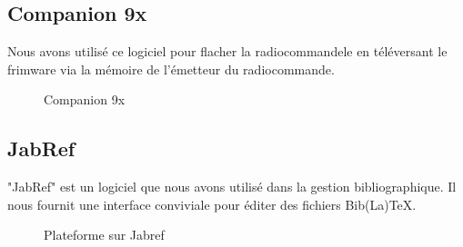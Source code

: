	\subsection{Companion 9x}
	Nous avons utilisé ce logiciel pour flacher la radiocommandele en téléversant le frimware via la mémoire de l'émetteur du radiocommande.
	\begin{figure}[H]
		\begin{center}
			\centering
		\end{center}
		\caption{Companion 9x}
	\end{figure}
	
	\subsection{JabRef}
	"JabRef" est un logiciel que nous avons utilisé dans la gestion bibliographique. Il nous fournit une interface conviviale pour éditer des fichiers Bib(La)TeX.
	\begin{figure}[H]
		\begin{center}
			\centering
		\end{center}
		\caption{Plateforme sur Jabref}
	\end{figure}
